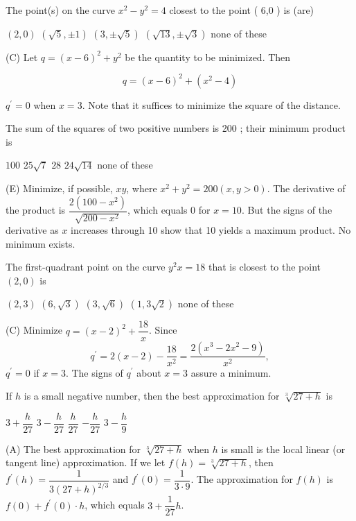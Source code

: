 \newpage




\question
The point(s) on the curve $x^{2}-y^{2}=4$ closest to the point ( 6,0 ) is (are)
\begin{choices}
  \choice $(2,0)$
  \choice $(\sqrt{5}, \pm 1)$
  \CorrectChoice $(3, \pm \sqrt{5})$
  \choice $(\sqrt{13}, \pm \sqrt{3})$
  \choice none of these
\end{choices}
\begin{solution}
(C) Let $q=(x-6)^{2}+y^{2}$ be the quantity to be minimized. Then

\[
q=(x-6)^{2}+\left(x^{2}-4\right)
\]

$q^{\prime}=0$ when $x=3$. Note that it suffices to minimize the square of the distance.
\end{solution}

\question
The sum of the squares of two positive numbers is 200 ; their minimum product is
\begin{choices}
  \choice $100$
  \choice $25 \sqrt{7}$
  \choice $28$
  \choice $24 \sqrt{14}$
  \CorrectChoice none of these
\end{choices}
\begin{solution}
(E) Minimize, if possible, $x y$, where $x^{2}+y^{2}=200(x, y>0)$. The derivative of the product is $\dfrac{2\left(100-x^{2}\right)}{\sqrt{200-x^{2}}}$, which equals 0 for $x=10$. But the signs of the derivative as $x$ increases through 10 show that 10 yields a maximum product. No minimum exists.
\end{solution}

\question
The first-quadrant point on the curve $y^{2} x=18$ that is closest to the point $(2,0)$ is
\begin{choices}
  \choice $(2,3)$
  \choice $(6, \sqrt{3})$
  \CorrectChoice $(3, \sqrt{6})$
  \choice $(1,3 \sqrt{2})$
  \choice none of these
\end{choices}
\begin{solution}
(C) Minimize $q=(x-2)^{2}+\dfrac{18}{x}$. Since
\[
q^{\prime}=2(x-2)-\dfrac{18}{x^{2}}=\dfrac{2\left(x^{3}-2 x^{2}-9\right)}{x^{2}},
\]
$q^{\prime}=0$ if $x=3$. The signs of $q^{\prime}$ about $x=3$ assure a minimum.
\end{solution}





\newpage




\question
If $h$ is a small negative number, then the best approximation for $\sqrt[3]{27+h}$ is
\begin{choices}
  \CorrectChoice $3+\dfrac{h}{27}$
  \choice $3-\dfrac{h}{27}$
  \choice $\dfrac{h}{27}$
  \choice $-\dfrac{h}{27}$
  \choice $3-\dfrac{h}{9}$
\end{choices}
\begin{solution}
(A) The best approximation for $\sqrt[3]{27+h}$ when $h$ is small is the local linear (or tangent line) approximation. If we let $f(h)=\sqrt[3]{27+h}$, then $f^{\prime}(h)=\dfrac{1}{3(27+h)^{2 / 3}}$ and $f^{\prime}(0)=\dfrac{1}{3 \cdot 9}$. The approximation for $f(h)$ is $f(0)+f^{\prime}(0) \cdot h$, which equals $3+\dfrac{1}{27} h$.
\end{solution}


